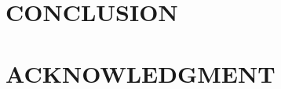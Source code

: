 \documentclass[letterpaper, 10 pt, conference]{ieeeconf}  %
\begin{document}
\section{CONCLUSION}








\addtolength{\textheight}{-10cm}   %

\section*{ACKNOWLEDGMENT}






\end{document}
